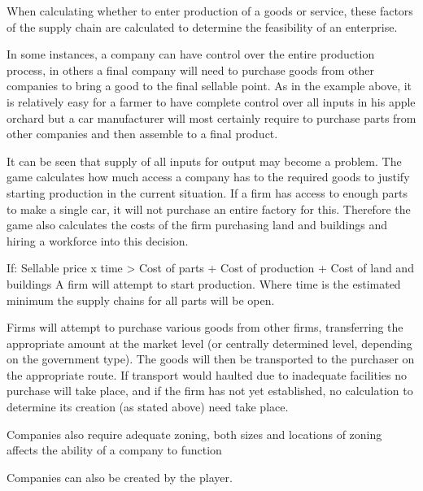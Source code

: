 When calculating whether to enter production of a goods or service, these factors of the supply chain are calculated to determine the feasibility of an enterprise.

In some instances, a company can have control over the entire production process, in others a final company will need to purchase goods from other companies to bring a good to the final sellable point. As in the example above, it is relatively easy for a farmer to have complete control over all inputs in his apple orchard but a car manufacturer will most certainly require to purchase parts from other companies and then assemble to a final product.

It can be seen that supply of all inputs for output may become a problem. The game calculates how much access a company has to the required goods to justify starting production in the current situation. If a firm has access to enough parts to make a single car, it will not purchase an entire factory for this. Therefore the game also calculates the costs of the firm purchasing land and buildings and hiring a workforce into this decision.

If: Sellable price x time  > Cost of parts + Cost of production + Cost of land and buildings
A firm will attempt to start production. Where time is the estimated minimum the supply chains for all parts will be open.        


Firms will attempt to purchase various goods from other firms, transferring the appropriate amount at the market level (or centrally determined level, depending on the government type). The goods will then be transported to the purchaser on the appropriate route. If transport would haulted due to inadequate facilities no purchase will take place, and if the firm has not yet established, no calculation to determine its creation (as stated above) need take place.





Companies also require adequate zoning, both sizes and locations of zoning affects the ability of a company to function 







Companies can also be created by the player.










